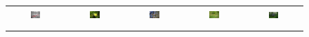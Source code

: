 \begin{figure}[th]
{\small{
\begin{center}
\begin{tabular}{@{}c@{\,\,\,}c@{\,\,\,}c@{\,\,\,}c@{\,\,\,}c@{\,\,\,}}
\includegraphics[width=0.19\textwidth]{imggrid/falseposi/6.jpg} &
\includegraphics[width=0.19\textwidth]{imggrid/falseposi/7.jpg} &
\includegraphics[width=0.19\textwidth]{imggrid/falseposi/8.jpg} &
\includegraphics[width=0.19\textwidth]{imggrid/falseposi/9.jpg} &
\includegraphics[width=0.19\textwidth]{imggrid/falseposi/10.jpg} \\
\\[-6pt]
\hline
\\[-6pt]

\end{tabular}
\end{center}}}
\end{figure}
